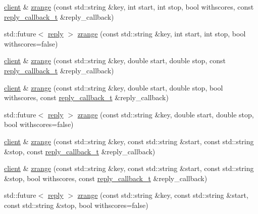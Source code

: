 \begin{DoxyCompactItemize}
\hyperlink{classcpp__redis_1_1client}{client} \& \hyperlink{classcpp__redis_1_1client_a7a86805d2495c3866df9095ea71ab842}{zrange} (const std\+::string \&key, int start, int stop, bool withscores, const \hyperlink{classcpp__redis_1_1client_a061a1140d36d2eaeda82b09a0bb3f9f2}{reply\+\_\+callback\+\_\+t} \&reply\+\_\+callback)
\item 
std\+::future$<$ \hyperlink{classcpp__redis_1_1reply}{reply} $>$ \hyperlink{classcpp__redis_1_1client_a75f0e330b851c7bfcf373a7ef9f30cb8}{zrange} (const std\+::string \&key, int start, int stop, bool withscores=false)
\item 
\hyperlink{classcpp__redis_1_1client}{client} \& \hyperlink{classcpp__redis_1_1client_a24f15cede24bdb482167b1ea00db3160}{zrange} (const std\+::string \&key, double start, double stop, const \hyperlink{classcpp__redis_1_1client_a061a1140d36d2eaeda82b09a0bb3f9f2}{reply\+\_\+callback\+\_\+t} \&reply\+\_\+callback)
\item 
\hyperlink{classcpp__redis_1_1client}{client} \& \hyperlink{classcpp__redis_1_1client_ab37fd922b733c5fa64f7a0dc4be22efe}{zrange} (const std\+::string \&key, double start, double stop, bool withscores, const \hyperlink{classcpp__redis_1_1client_a061a1140d36d2eaeda82b09a0bb3f9f2}{reply\+\_\+callback\+\_\+t} \&reply\+\_\+callback)
\item 
std\+::future$<$ \hyperlink{classcpp__redis_1_1reply}{reply} $>$ \hyperlink{classcpp__redis_1_1client_a0286a2953aeaec8c23d0e292fe2fccc2}{zrange} (const std\+::string \&key, double start, double stop, bool withscores=false)
\item 
\hyperlink{classcpp__redis_1_1client}{client} \& \hyperlink{classcpp__redis_1_1client_ad24c21a0344652d821d0628c68057ecb}{zrange} (const std\+::string \&key, const std\+::string \&start, const std\+::string \&stop, const \hyperlink{classcpp__redis_1_1client_a061a1140d36d2eaeda82b09a0bb3f9f2}{reply\+\_\+callback\+\_\+t} \&reply\+\_\+callback)
\item 
\hyperlink{classcpp__redis_1_1client}{client} \& \hyperlink{classcpp__redis_1_1client_a3768026508c4c2e28c600bf7be54b4a1}{zrange} (const std\+::string \&key, const std\+::string \&start, const std\+::string \&stop, bool withscores, const \hyperlink{classcpp__redis_1_1client_a061a1140d36d2eaeda82b09a0bb3f9f2}{reply\+\_\+callback\+\_\+t} \&reply\+\_\+callback)
\item 
std\+::future$<$ \hyperlink{classcpp__redis_1_1reply}{reply} $>$ \hyperlink{classcpp__redis_1_1client_aaaaf7f2d11f02bc7709be1b2a654894d}{zrange} (const std\+::string \&key, const std\+::string \&start, const std\+::string \&stop, bool withscores=false)

\end{DoxyCompactItemize}
